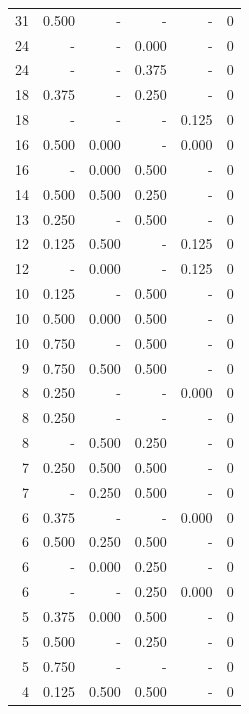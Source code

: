 \documentclass[a4paper]{article}\usepackage[]{graphicx}\usepackage[]{color}
\begin{document}
\begin{table}[ht]
\begin{tabular}{rrrrrr}
   \rowcolor{nullColor} 31 & 0.500 & - & - & - & 0 \\ 
   \rowcolor{sosoColor} 24 & - & - & 0.000 & - & 0 \\ 
   \rowcolor{sosoColor} 24 & - & - & 0.375 & - & 0 \\ 
   \rowcolor{sosoColor} 18 & 0.375 & - & 0.250 & - & 0 \\ 
   \rowcolor{nullColor} 18 & - & - & - & 0.125 & 0 \\ 
  16 & 0.500 & 0.000 & - & 0.000 & 0 \\ 
   \rowcolor{badColor} 16 & - & 0.000 & 0.500 & - & 0 \\ 
   \rowcolor{badColor} 14 & 0.500 & 0.500 & 0.250 & - & 0 \\ 
   \rowcolor{sosoColor} 13 & 0.250 & - & 0.500 & - & 0 \\ 
  12 & 0.125 & 0.500 & - & 0.125 & 0 \\ 
  12 & - & 0.000 & - & 0.125 & 0 \\ 
   \rowcolor{sosoColor} 10 & 0.125 & - & 0.500 & - & 0 \\ 
   \rowcolor{badColor} 10 & 0.500 & 0.000 & 0.500 & - & 0 \\ 
   \rowcolor{sosoColor} 10 & 0.750 & - & 0.500 & - & 0 \\ 
   \rowcolor{goodColor} 9 & 0.750 & 0.500 & 0.500 & - & 0 \\ 
   \rowcolor{nullColor} 8 & 0.250 & - & - & 0.000 & 0 \\ 
   \rowcolor{nullColor} 8 & 0.250 & - & - & - & 0 \\ 
   \rowcolor{badColor} 8 & - & 0.500 & 0.250 & - & 0 \\ 
   \rowcolor{goodColor} 7 & 0.250 & 0.500 & 0.500 & - & 0 \\ 
   \rowcolor{badColor} 7 & - & 0.250 & 0.500 & - & 0 \\ 
   \rowcolor{nullColor} 6 & 0.375 & - & - & 0.000 & 0 \\ 
   \rowcolor{badColor} 6 & 0.500 & 0.250 & 0.500 & - & 0 \\ 
   \rowcolor{badColor} 6 & - & 0.000 & 0.250 & - & 0 \\ 
   \rowcolor{sosoColor} 6 & - & - & 0.250 & 0.000 & 0 \\ 
   \rowcolor{badColor} 5 & 0.375 & 0.000 & 0.500 & - & 0 \\ 
   \rowcolor{sosoColor} 5 & 0.500 & - & 0.250 & - & 0 \\ 
   \rowcolor{nullColor} 5 & 0.750 & - & - & - & 0 \\ 
   \rowcolor{goodColor} 4 & 0.125 & 0.500 & 0.500 & - & 0 \\ 

\end{tabular}
\end{table}
\end{document}

